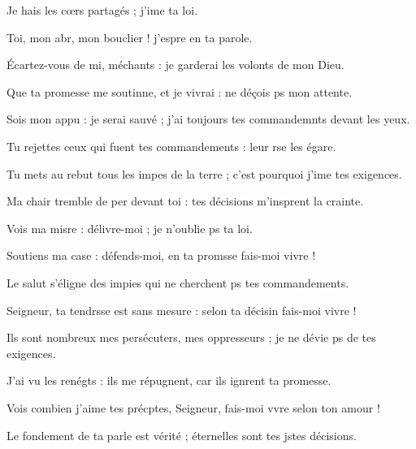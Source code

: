 \item Je hais les cœrs partagés ;\psstar{} j’ime ta loi.
\item Toi, mon abr, mon bouclier !\psstar{} j’espre en ta parole.
\item Écartez-vous de mi, méchants :\psstar{} je garderai les volonts de mon Dieu.
\item Que ta promesse me soutinne, et je vivrai :\psstar{} ne déçois ps mon attente.
\item Sois mon appu : je serai sauvé ;\psstar{} j’ai toujours tes commandemnts devant les yeux.
\item Tu rejettes ceux qui fuent tes commandements :\psstar{} leur rse les égare.
\item Tu mets au rebut tous les impes de la terre ;\psstar{} c’est pourquoi j’ime tes exigences.
\item Ma chair tremble de per devant toi :\psstar{} tes décisions m’insprent la crainte.
\item Vois ma misre : délivre-moi ;\psstar{} je n’oublie ps ta loi.
\item Soutiens ma case : défends-moi,\psstar{} en ta promsse fais-moi vivre !
\item Le salut s’éligne des impies\psstar{} qui ne cherchent ps tes commandements.
\item Seigneur, ta tendrsse est sans mesure :\psstar{} selon ta décisin fais-moi vivre !
\item Ils sont nombreux mes persécuters, mes oppresseurs ;\psstar{} je ne dévie ps de tes exigences.
\item J’ai vu les renégts : ils me répugnent,\psstar{} car ils ignrent ta promesse.
\item Vois combien j’aime tes précptes, Seigneur,\psstar{} fais-moi vvre selon ton amour !
\item Le fondement de ta parle est vérité ;\psstar{} éternelles sont tes jstes décisions.
